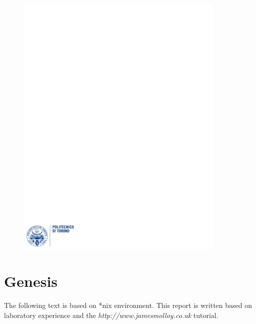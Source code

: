 \documentclass[12pt]{article}
\begin{document}
\begin{figure}
  \centering
  \includegraphics[width=10cm]{images/polito.pdf}
\end{figure}

\maketitle
\newpage

\section{Genesis}
The following text is based on *nix environment. This report is written based on laboratory experience and the \textit{http://www.jamesmolloy.co.uk} tutorial.
\end{document}
